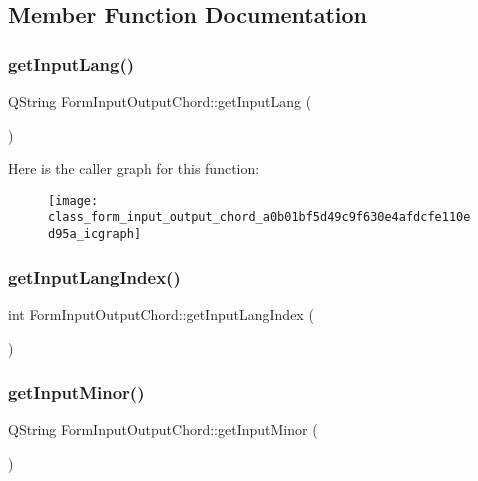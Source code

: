 \subsection{Member Function Documentation}
\mbox{\label{class_form_input_output_chord_a0b01bf5d49c9f630e4afdcfe110ed95a}} 
\subsubsection{get\+Input\+Lang()}
{\footnotesize\ttfamily Q\+String Form\+Input\+Output\+Chord\+::get\+Input\+Lang (\begin{DoxyParamCaption}{ }\end{DoxyParamCaption})}

Here is the caller graph for this function\+:\nopagebreak
\begin{figure}[H]
\begin{center}
\leavevmode
\texttt{[image: class\_form\_input\_output\_chord\_a0b01bf5d49c9f630e4afdcfe110ed95a\_icgraph]}
\end{center}
\end{figure}
\mbox{\label{class_form_input_output_chord_a4970e270f717994a69185a156e85a456}} 
\subsubsection{get\+Input\+Lang\+Index()}
{\footnotesize\ttfamily int Form\+Input\+Output\+Chord\+::get\+Input\+Lang\+Index (\begin{DoxyParamCaption}{ }\end{DoxyParamCaption})}

\mbox{\label{class_form_input_output_chord_ab12e4c816827958d69bdbfee165e4573}} 
\subsubsection{get\+Input\+Minor()}
{\footnotesize\ttfamily Q\+String Form\+Input\+Output\+Chord\+::get\+Input\+Minor (\begin{DoxyParamCaption}{ }\end{DoxyParamCaption})}

